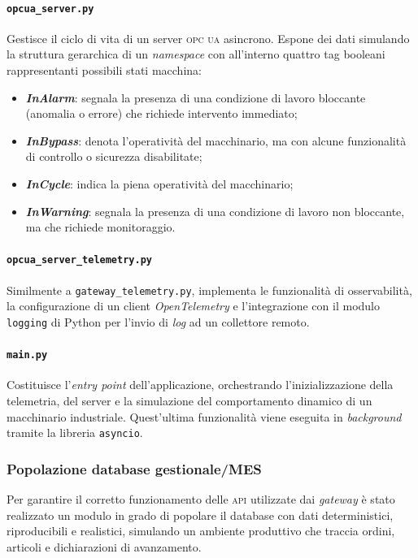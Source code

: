 \documentclass[12pt]{article}
\begin{document}
    \paragraph{\texttt{opcua\_server.py}} Gestisce il ciclo di vita di un server \textsc{opc ua} asincrono. Espone dei dati simulando la struttura gerarchica di un \textit{namespace} con all'interno quattro tag booleani rappresentanti possibili stati macchina:
    \begin{itemize}
        \item \textbf{\textit{InAlarm}}: segnala la presenza di una condizione di lavoro bloccante (anomalia o errore) che richiede intervento immediato;
        \item \textbf{\textit{InBypass}}: denota l'operatività del macchinario, ma con alcune funzionalità di controllo o sicurezza disabilitate;
        \item \textbf{\textit{InCycle}}: indica la piena operatività del macchinario;
        \item \textbf{\textit{InWarning}}: segnala la presenza di una condizione di lavoro non bloccante, ma che richiede monitoraggio.
    \end{itemize}
    
    \paragraph{\texttt{opcua\_server\_telemetry.py}} Similmente a \texttt{gateway\_telemetry.py}, implementa le funzionalità di osservabilità, la configurazione di un client \textit{OpenTelemetry} e l'integrazione con il modulo \verb|logging| di Python per l'invio di \textit{log} ad un collettore remoto.
 
    \paragraph{\texttt{main.py}} Costituisce l'\textit{entry point} dell'applicazione, orchestrando l'inizializzazione della telemetria, del server e la simulazione del comportamento dinamico di un macchinario industriale. Quest'ultima funzionalità viene eseguita in \textit{background} tramite la libreria \verb|asyncio|.

    \subsubsection{Popolazione database gestionale/MES}

    Per garantire il corretto funzionamento delle \textsc{api} utilizzate dai \textit{gateway} è stato realizzato un modulo in grado di popolare il database con dati deterministici, riproducibili e realistici, simulando un ambiente produttivo che traccia ordini, articoli e dichiarazioni di avanzamento.
\end{document}
